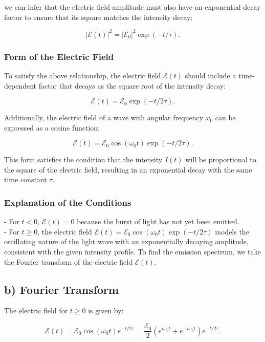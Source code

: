 \documentclass{article}
\begin{document}
	we can infer that the electric field amplitude must also have an exponential decay factor to ensure that its square matches the intensity decay:
	
	\[
	|\mathcal{E}(t)|^2 = |\mathcal{E}_0|^2 \exp(-t/\tau).
	\]
	
	\subsubsection*{Form of the Electric Field}
	
	To satisfy the above relationship, the electric field \(\mathcal{E}(t)\) should include a time-dependent factor that decays as the square root of the intensity decay:
	
	\[
	\mathcal{E}(t) = \mathcal{E}_0 \exp(-t/2\tau).
	\]
	
	Additionally, the electric field of a wave with angular frequency \(\omega_0\) can be expressed as a cosine function:
	
	\[
	\mathcal{E}(t) = \mathcal{E}_0 \cos(\omega_0 t) \exp(-t/2\tau).
	\]
	
	This form satisfies the condition that the intensity \(I(t)\) will be proportional to the square of the electric field, resulting in an exponential decay with the same time constant \(\tau\).
	
	\subsubsection*{Explanation of the Conditions}
	
	- For \(t < 0\), \(\mathcal{E}(t) = 0\) because the burst of light has not yet been emitted.\\
	- For \(t \geq 0\), the electric field \(\mathcal{E}(t) = \mathcal{E}_0 \cos(\omega_0 t) \exp(-t/2\tau)\) models the oscillating nature of the light wave with an exponentially decaying amplitude, consistent with the given intensity profile.
To find the emission spectrum, we take the Fourier transform of the electric field \(\mathcal{E}(t)\).

\subsection*{b) Fourier Transform}

The electric field for \(t \geq 0\) is given by:

\[
\mathcal{E}(t) = \mathcal{E}_0 \cos(\omega_0 t) e^{-t/2\tau} = \frac{\mathcal{E}_0}{2} \left( e^{i\omega_0 t} + e^{-i\omega_0 t} \right) e^{-t/2\tau}.
\]
\end{document}
